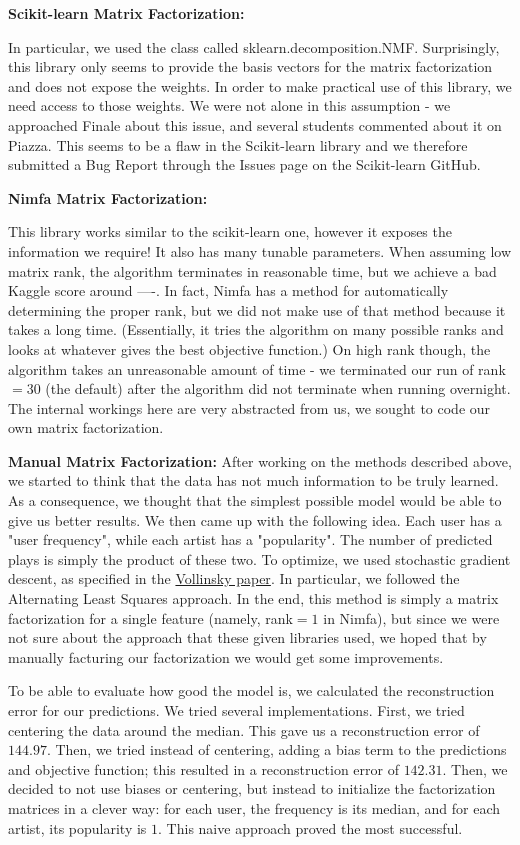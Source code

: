 \documentclass[10pt]{article}
\begin{document}
{\bf Scikit-learn Matrix Factorization:}

In particular, we used the class called sklearn.decomposition.NMF. Surprisingly, this library only seems to provide the basis vectors for the matrix factorization and does not expose the weights. In order to make practical use of this library, we need access to those weights. We were not alone in this assumption - we approached Finale about this issue, and several students commented about it on Piazza. This seems to be a flaw in the Scikit-learn library and we therefore submitted a Bug Report through the Issues page on the Scikit-learn GitHub.

{\bf Nimfa Matrix Factorization:}

This library works similar to the scikit-learn one, however it exposes the information we require! It also has many tunable parameters. When assuming low matrix rank, the algorithm terminates in reasonable time, but we achieve a bad Kaggle score around ----.  In fact, Nimfa has a method for automatically determining the proper rank, but we did not make use of that method because it takes a long time. (Essentially, it tries the algorithm on many possible ranks and looks at whatever gives the best objective function.) On high rank though, the algorithm takes an unreasonable amount of time - we terminated our run of rank$=30$ (the default) after the algorithm did not terminate when running overnight. The internal workings here are very abstracted from us, we sought to code our own matrix factorization.

{\bf Manual Matrix Factorization:}
After working on the methods described above, we started to think that the data has not much information to be truly learned. As a consequence, we thought that the simplest possible model would be able to give us better results. We then came up with the following idea. Each user has a "user frequency", while each artist has a "popularity". The number of predicted plays is simply the product of these two. To optimize, we used stochastic gradient descent, as specified in the \href{https://datajobs.com/data-science-repo/Recommender-Systems-[Netflix].pdf}{Vollinsky paper}. In particular, we followed the Alternating Least Squares approach. In the end, this method is simply a matrix factorization for a single feature (namely, rank$=1$ in Nimfa), but since we were not sure about the approach that these given libraries used, we hoped that by manually facturing our factorization we would get some improvements.

To be able to evaluate how good the model is, we calculated the reconstruction error for our predictions. We tried several implementations. First, we tried centering the data around the median. This gave us a reconstruction error of $144.97$. Then, we tried instead of centering, adding a bias term to the predictions and objective function; this resulted in a reconstruction error of $142.31$. Then, we decided to not use biases or centering, but instead to initialize the factorization matrices in a clever way: for each user, the frequency is its median, and for each artist, its popularity is $1$. This naive approach proved the most successful.
\end{document}
